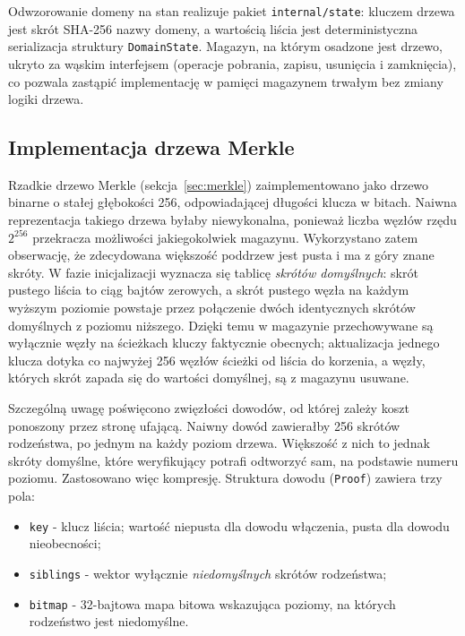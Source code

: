 Odwzorowanie domeny na stan realizuje pakiet \texttt{internal/state}: kluczem drzewa jest skrót SHA-256 nazwy domeny, a wartością liścia jest deterministyczna serializacja struktury \texttt{DomainState}. Magazyn, na którym osadzone jest drzewo, ukryto za wąskim interfejsem (operacje pobrania, zapisu, usunięcia i zamknięcia), co pozwala zastąpić implementację w pamięci magazynem trwałym bez zmiany logiki drzewa.

\subsection{Implementacja drzewa Merkle}
\label{subsec:implementacja-merkle}

Rzadkie drzewo Merkle (sekcja~\ref{sec:merkle}) zaimplementowano jako drzewo binarne o stałej głębokości 256, odpowiadającej długości klucza w bitach. Naiwna reprezentacja takiego drzewa byłaby niewykonalna, ponieważ liczba węzłów rzędu $2^{256}$ przekracza możliwości jakiegokolwiek magazynu. Wykorzystano zatem obserwację, że zdecydowana większość poddrzew jest pusta i ma z góry znane skróty. W fazie inicjalizacji wyznacza się tablicę \emph{skrótów domyślnych}: skrót pustego liścia to ciąg bajtów zerowych, a skrót pustego węzła na każdym wyższym poziomie powstaje przez połączenie dwóch identycznych skrótów domyślnych z poziomu niższego. Dzięki temu w magazynie przechowywane są wyłącznie węzły na ścieżkach kluczy faktycznie obecnych; aktualizacja jednego klucza dotyka co najwyżej 256 węzłów ścieżki od liścia do korzenia, a węzły, których skrót zapada się do wartości domyślnej, są z magazynu usuwane.

Szczególną uwagę poświęcono zwięzłości dowodów, od której zależy koszt ponoszony przez stronę ufającą. Naiwny dowód zawierałby 256 skrótów rodzeństwa, po jednym na każdy poziom drzewa. Większość z nich to jednak skróty domyślne, które weryfikujący potrafi odtworzyć sam, na podstawie numeru poziomu. Zastosowano więc kompresję. Struktura dowodu (\texttt{Proof}) zawiera trzy pola:
\begin{itemize}
    \item \texttt{key} - klucz liścia; wartość niepusta dla dowodu włączenia, pusta dla dowodu nieobecności;
    \item \texttt{siblings} - wektor wyłącznie \emph{niedomyślnych} skrótów rodzeństwa;
    \item \texttt{bitmap} - 32-bajtowa mapa bitowa wskazująca poziomy, na których rodzeństwo jest niedomyślne.
\end{itemize}

